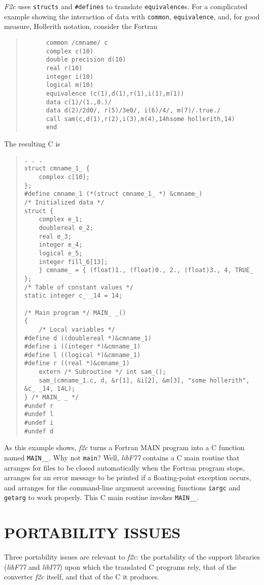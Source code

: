 \documentclass[10pt,a4paper]{article}
\begin{document}
\emph{F2c} uses \verb|structs| and \verb|#defines| to translate \verb|equivalence|s. For a complicated example showing the interaction of data with \verb|common|, \verb|equivalence|, and, for good measure, Hollerith notation, consider the Fortran
\begin{quote}
\begin{verbatim}
      common /cmname/ c
      complex c(10)
      double precision d(10)
      real r(10)
      integer i(10)
      logical m(10)
      equivalence (c(1),d(1),r(1),i(1),m(1))
      data c(1)/(1.,0.)/
      data d(2)/2d0/, r(5)/3e0/, i(6)/4/, m(7)/.true./
      call sam(c,d(1),r(2),i(3),m(4),14hsome hollerith,14)
      end
\end{verbatim}
\end{quote}
The resulting C is
\begin{quote}
\begin{verbatim}
. . .
struct cmname_1_ {
    complex c[10];
};
#define cmname_1 (*(struct cmname_1_ *) &cmname_)
/* Initialized data */
struct {
    complex e_1;
    doublereal e_2;
    real e_3;
    integer e_4;
    logical e_5;
    integer fill_6[13];
    } cmname_ = { (float)1., (float)0., 2., (float)3., 4, TRUE_ };
/* Table of constant values */
static integer c_ _14 = 14;

/* Main program */ MAIN_ _()
{
    /* Local variables */
#define d ((doublereal *)&cmname_1)
#define i ((integer *)&cmname_1)
#define l ((logical *)&cmname_1)
#define r ((real *)&cmname_1)
    extern /* Subroutine */ int sam_();
    sam_(cmname_1.c, d, &r[1], &i[2], &m[3], "some hollerith", &c_ _14, 14L);
} /* MAIN_ _ */
#undef r
#undef l
#undef i
#undef d
\end{verbatim}
\end{quote}
As this example shows, \emph{f2c} turns a Fortran MAIN program into a C function named \verb|MAIN__|. Why not \verb|main|? Well, \emph{libF77} contains a C main routine that arranges for files to be closed automatically when the Fortran program stops, arranges for an error message to be printed if a floating-point exception occurs, and arranges for the command-line argument accessing functions \verb|iargc| and \verb|getarg| to work properly. This C main routine invokes \verb|MAIN__|.

\section{PORTABILITY ISSUES} \label{sec:portability}

Three portability issues are relevant to \emph{f2c}: the portability of the support libraries (\emph{libF77} and \emph{libI77}) upon which the translated C programs rely, that of the converter \emph{f2c} itself, and that of the C it produces.
\end{document}

